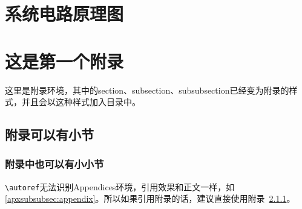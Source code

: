 \documentclass[supercite]{HustGraduPaper}
\begin{document}


\begin{appendices}
	\section{系统电路原理图}
	\section{这是第一个附录}
	这里是附录环境，其中的section、subsection、subsubsection已经变为附录的样式，并且会以这种样式加入目录中。
	\subsection{附录可以有小节}
	\subsubsection{附录中也可以有小小节}\label{apxsubsubsec:appendix}
	\verb|\autoref|无法识别Appendices环境，引用效果和正文一样，如\autoref{apxsubsubsec:appendix}。所以如果引用附录的话，建议直接使用附录~\ref{apxsubsubsec:appendix}。
\end{appendices}
\end{document}
